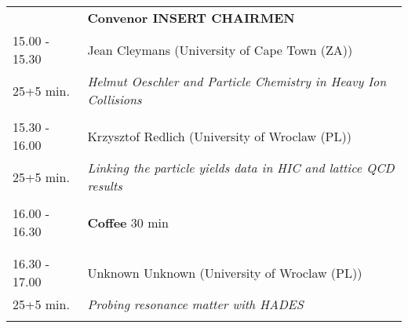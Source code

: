 \begin{longtable}{p{3cm}p{13cm}}
&\hfill {\bf Convenor INSERT CHAIRMEN }\\ 
15.00 - 15.30 & Jean Cleymans (University of Cape Town (ZA))\\ 
25+5 min. & {\it Helmut Oeschler and Particle Chemistry in Heavy Ion Collisions}\\ 
 & \\ 
15.30 - 16.00 & Krzysztof Redlich (University of Wroclaw (PL))\\ 
25+5 min. & {\it Linking the particle yields data in HIC and lattice QCD results}\\ 
 & \\ 
16.00 - 16.30 & {\bf Coffee} \hfill 30 min \\ 
 & \\ 
 & \\ 
16.30 - 17.00 & Unknown Unknown (University of Wroclaw (PL))\\ 
25+5 min. & {\it Probing resonance matter with HADES}\\ 
 & \\ 
\end{longtable}

